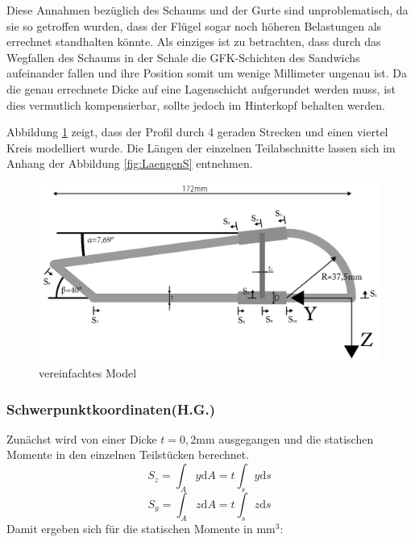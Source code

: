 Diese Annahmen bezüglich des Schaums und der Gurte sind unproblematisch, da sie so getroffen wurden, dass der Flügel sogar noch höheren Belastungen als errechnet standhalten könnte. Als einziges ist zu betrachten, dass durch das Wegfallen des Schaums in der Schale die GFK-Schichten des Sandwichs aufeinander fallen und ihre Position somit um wenige Millimeter ungenau ist. Da die genau errechnete Dicke auf eine Lagenschicht aufgerundet werden muss, ist dies vermutlich kompensierbar, sollte jedoch im Hinterkopf behalten werden.

Abbildung \ref{Fluegel1} zeigt, dass der Profil durch 4 geraden Strecken und einen viertel Kreis modelliert wurde. Die Längen der einzelnen Teilabschnitte lassen sich im Anhang der Abbildung \ref{fig:LaengenS} entnehmen.
\begin{figure}[h]
 \centering
 \includegraphics[width=1\textwidth]{Bilder/Model1}
 \caption{vereinfachtes Model}
 \label{Fluegel1}
\end{figure}
\subsubsection{Schwerpunktkoordinaten(H.G.)}\label{SP-Koord}
Zunächst wird von einer Dicke $t=0,2\mathrm{mm}$ ausgegangen und die statischen Momente in den einzelnen Teilstücken berechnet.
\begin{equation}\label{SM1}
	S_{z}=\int_{A}^{}y \mathrm{d}A =t\int_{s}^{}y \mathrm{d}s
\end{equation}
\begin{equation}\label{SM2}
	S_{y}=\int_{A}^{}z \mathrm{d}A =t\int_{s}^{}z \mathrm{d}s 
\end{equation}
Damit ergeben sich für die statischen Momente in $\mathrm{mm}^3$:

